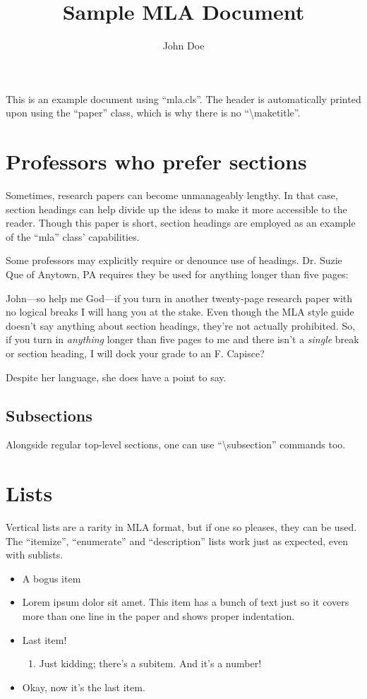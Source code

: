 \documentclass[mla8]{mla}
\title{Sample MLA Document}
\author{John Doe}
\date{\mladate} %
\begin{document}
\begin{paper}

This is an example document using ``mla.cls''.
The header is automatically printed upon using the ``paper'' class,
which is why there is no ``\textbackslash{}maketitle''.

\section{Professors who prefer sections}

Sometimes, research papers can become unmanageably lengthy.
In that case, section headings can help divide up the ideas
to make it more accessible to the reader.
Though this paper is short, section headings are employed
as an example of the ``mla'' class' capabilities.

Some professors may explicitly require or denounce use of headings.
Dr. Suzie Que of Anytown, PA requires they be used for anything
longer than five pages:
\begin{blockquote}
John---so help me God---if you turn in another twenty-page research
paper with no logical breaks I will hang you at the stake.
Even though the MLA style guide doesn't say anything about
section headings, they're not actually prohibited.
So, if you turn in \emph{anything} longer than five pages to me
and there isn't a \emph{single} break or section heading,
I will dock your grade to an F.
Capisce? \cite{que2019}
\end{blockquote}
Despite her language, she does have a point to say.

\subsection{Subsections}

Alongside regular top-level sections, one can use
``\textbackslash{}subsection'' commands too.

\section{Lists}

Vertical lists are a rarity in MLA format, but if one so pleases,
they can be used.
The ``itemize'', ``enumerate'' and ``description'' lists
work just as expected, even with sublists.

\begin{itemize}
\item A bogus item
\item Lorem ipsum dolor sit amet.  This item has a bunch of text
	just so it covers more than one line in the paper and shows
	proper indentation.
\item Last item!
\begin{enumerate}
\item Just kidding; there's a subitem.  And it's a number!
\end{enumerate}
\item Okay, now it's the last item.
\end{itemize}


\end{paper}
\end{document}

